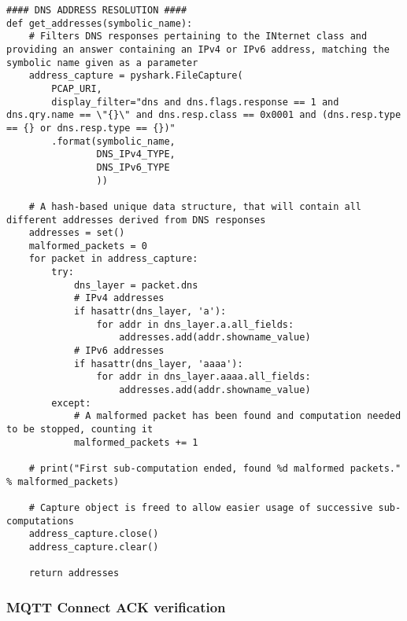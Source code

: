 \documentclass[a4paper,11pt]{article} %
\begin{document}
    \begin{verbatim}
#### DNS ADDRESS RESOLUTION ####
def get_addresses(symbolic_name):
    # Filters DNS responses pertaining to the INternet class and providing an answer containing an IPv4 or IPv6 address, matching the symbolic name given as a parameter
    address_capture = pyshark.FileCapture(
        PCAP_URI,
        display_filter="dns and dns.flags.response == 1 and dns.qry.name == \"{}\" and dns.resp.class == 0x0001 and (dns.resp.type == {} or dns.resp.type == {})"
        .format(symbolic_name,
                DNS_IPv4_TYPE,
                DNS_IPv6_TYPE
                ))

    # A hash-based unique data structure, that will contain all different addresses derived from DNS responses
    addresses = set()
    malformed_packets = 0
    for packet in address_capture:
        try:
            dns_layer = packet.dns
            # IPv4 addresses
            if hasattr(dns_layer, 'a'):
                for addr in dns_layer.a.all_fields:
                    addresses.add(addr.showname_value)
            # IPv6 addresses
            if hasattr(dns_layer, 'aaaa'):
                for addr in dns_layer.aaaa.all_fields:
                    addresses.add(addr.showname_value)
        except:
            # A malformed packet has been found and computation needed to be stopped, counting it
            malformed_packets += 1

    # print("First sub-computation ended, found %d malformed packets." % malformed_packets)

    # Capture object is freed to allow easier usage of successive sub-computations
    address_capture.close()
    address_capture.clear()

    return addresses
    \end{verbatim}

    \subsubsection{MQTT Connect ACK verification}
\end{document}
